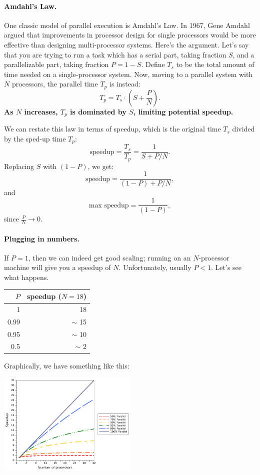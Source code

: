 \documentclass[a4paper]{report}
\begin{document}
\paragraph{Amdahl's Law.} One classic model of parallel execution
is Amdahl's Law. In 1967, Gene Amdahl argued that improvements in
processor design for single processors would be more effective than
designing multi-processor systems. Here's the argument. Let's say that
you are trying to run a task which has a serial part, taking fraction 
$S$, and a parallelizable part, taking fraction $P = 1-S$. Define $T_s$
to be the total 
amount of time needed on a single-processor system.
Now, moving to a parallel system with $N$ processors, the parallel
time $T_p$ is instead:
\[ T_p = T_s \cdot (S + \frac{P}{N}). \]
{\bf As $N$ increases, $T_p$ is dominated by $S$, limiting potential
speedup.}

We can restate this law in terms of speedup, which is the 
original time $T_s$ divided by the sped-up time $T_p$:
\[ \mbox{speedup} = \frac{T_s}{T_p} = \frac{1}{S+P/N}. \]
Replacing $S$ with $(1-P)$, we get:
\[ \mbox{speedup} = \frac{1}{(1-P)+P/N}, \]
and
\[ \mbox{max speedup} = \frac{1}{(1-P)}, \]
since $\frac{P}{N} \rightarrow 0$.

\paragraph{Plugging in numbers.} If $P = 1$, then we can indeed get good
scaling; running on an $N$-processor machine will give you a speedup
of $N$. Unfortunately, usually $P < 1$.  Let's see what happens.

\begin{center}
\begin{tabular}{r|r}
$P$ & speedup ($N=18$) \\ \hline
1 & 18 \\
0.99 & $\sim$ 15 \\
0.95 & $\sim$ 10 \\
0.5 & $\sim$ 2
\end{tabular}
\end{center}
Graphically, we have something like this:
\begin{center}
  \includegraphics[width=0.5\textwidth]{images/parallel-scaling}
\end{center}
\end{document}
